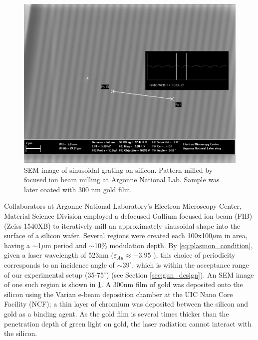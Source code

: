 \begin{figure}
  \centering
  \includegraphics{HighMagSEM.jpg}
  \caption[SEM image of sinusoidal grating on silicon]{
    SEM image of sinusoidal grating on silicon.
    Pattern milled by focused ion beam milling at Argonne National Lab.
    Sample was later coated with 300 nm gold film.
  }
  \label{fig:fib-si-sem}
\end{figure}

Collaborators at Argonne National Laboratory's Electron Microscopy Center, Material Science Division employed a defocused Gallium focused ion beam (FIB) (Zeiss 1540XB) to iteratively mill an approximately sinusoidal shape into the surface of a silicon wafer.
Several regions were created each 100x100$\mu$m in area, having a $\sim$1$\mu$m period and $\sim$10\% modulation depth.
By \ref{eq:plasmon_condition}, given a laser wavelength of 523nm ($\varepsilon_{Au} \approx -3.95$ \cite{johnson_optical_1972}), this choice of periodicity corresponds to an incidence angle of $\sim39^{\circ}$, which is within the acceptance range of our experimental setup (35-75$^{\circ}$) (see Section \ref{sec:gun_design}).
An SEM image of one such region is shown in \ref{fig:fib-si-sem}.
A 300nm film of gold was deposited onto the silicon using the Varian e-beam deposition chamber at the UIC Nano Core Facility (NCF); a thin layer of chromium was deposited between the silicon and gold as a binding agent.
As the gold film is several times thicker than the penetration depth of green light on gold, the laser radiation cannot interact with the silicon.

